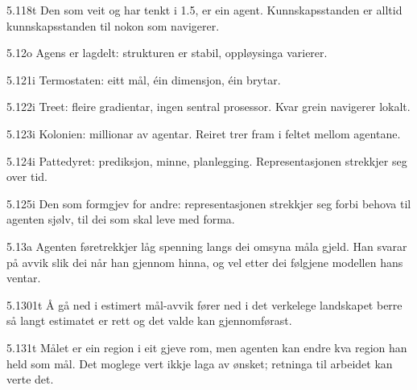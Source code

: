 \begin{formproposition}{5.118}{t}
Den som veit og har tenkt i 1.5, er ein agent. Kunnskapsstanden er alltid kunnskapsstanden til nokon som navigerer.
\end{formproposition}

\begin{formproposition}{5.12}{o}
Agens er lagdelt: strukturen er stabil, oppløysinga varierer.
\end{formproposition}

\begin{formproposition}{5.121}{i}
Termostaten: eitt mål, éin dimensjon, éin brytar.
\end{formproposition}

\begin{formproposition}{5.122}{i}
Treet: fleire gradientar, ingen sentral prosessor. Kvar grein navigerer lokalt.
\end{formproposition}

\begin{formproposition}{5.123}{i}
Kolonien: millionar av agentar. Reiret trer fram i feltet mellom agentane.
\end{formproposition}

\begin{formproposition}{5.124}{i}
Pattedyret: prediksjon, minne, planlegging. Representasjonen strekkjer seg over tid.
\end{formproposition}

\begin{formproposition}{5.125}{i}
Den som formgjev for andre: representasjonen strekkjer seg forbi behova til agenten sjølv, til dei som skal leve med forma.
\end{formproposition}

\begin{formproposition}{5.13}{a}
Agenten føretrekkjer låg spenning langs dei omsyna måla gjeld. Han svarar på avvik slik dei når han gjennom hinna, og vel etter dei følgjene modellen hans ventar.
\end{formproposition}

\begin{formproposition}{5.1301}{t}
Å gå ned i estimert mål-avvik fører ned i det verkelege landskapet berre så langt estimatet er rett og det valde kan gjennomførast.
\end{formproposition}

\begin{formproposition}{5.131}{t}
Målet er ein region i eit gjeve rom, men agenten kan endre kva region han held som mål. Det moglege vert ikkje laga av ønsket; retninga til arbeidet kan verte det.
\end{formproposition}

